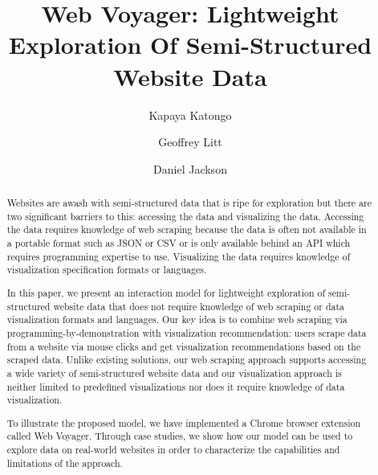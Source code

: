 \documentclass[sigconf,screen]{acmart}
\begin{document}
\title{Web Voyager: Lightweight Exploration Of Semi-Structured Website
Data}


\author{Kapaya Katongo}

\author{Geoffrey Litt}

\author{Daniel Jackson}


\begin{abstract}
  Websites are awash with semi-structured data that is ripe for
  exploration but there are two significant barriers to this: accessing
  the data and visualizing the data. Accessing the data requires
  knowledge of web scraping because the data is often not available in a
  portable format such as JSON or CSV or is only available behind an API
  which requires programming expertise to use. Visualizing the data
  requires knowledge of visualization specification formats or
  languages.

  In this paper, we present an interaction model for lightweight
  exploration of semi-structured website data that does not require
  knowledge of web scraping or data visualization formats and languages.
  Our key idea is to combine web scraping via
  programming-by-demonstration with visualization recommendation: users
  scrape data from a website via mouse clicks and get visualization
  recommendations based on the scraped data. Unlike existing solutions,
  our web scraping approach supports accessing a wide variety of
  semi-structured website data and our visualization approach is neither
  limited to predefined visualizations nor does it require knowledge of
  data visualization.

  To illustrate the proposed model, we have implemented a Chrome browser
  extension called Web Voyager. Through case studies, we show how our
  model can be used to explore data on real-world websites in order to
  characterize the capabilities and limitations of the approach.
\end{abstract}
\end{document}
